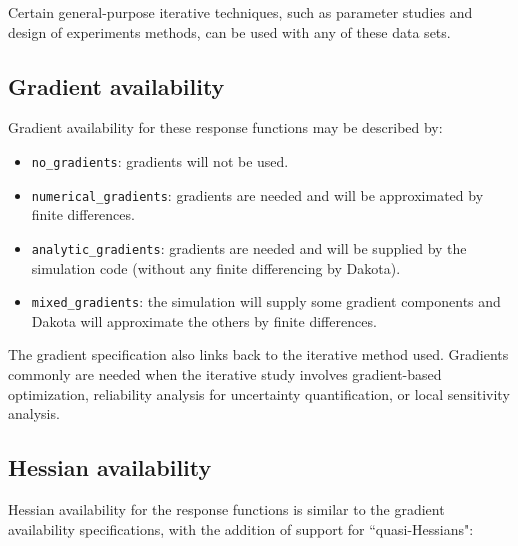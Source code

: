 Certain general-purpose iterative techniques, such as parameter
studies and design of experiments methods, can be used with any of
these data sets.

\subsection{Gradient availability}\label{responses:overview:gradient}

Gradient availability for these response functions may be described by:

\begin{itemize}

\item \texttt{no\_gradients}: gradients will not be used.

\item \texttt{numerical\_gradients}: gradients are needed and will
  be approximated by finite differences.

\item \texttt{analytic\_gradients}: gradients are needed and will be supplied
  by the simulation code (without any finite differencing by Dakota).

\item \texttt{mixed\_gradients}: the simulation will supply some gradient
  components and Dakota will approximate the others by finite
  differences.

\end{itemize}

The gradient specification also links back to the iterative method
used. Gradients commonly are needed when the iterative
study involves gradient-based optimization, reliability analysis for
uncertainty quantification, or local sensitivity analysis.

\subsection{Hessian availability}\label{responses:overview:hessian}

Hessian availability for the response functions is similar to the
gradient availability specifications, with the addition of support
for ``quasi-Hessians":

